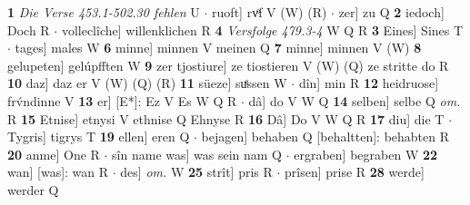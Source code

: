 \documentclass[8pt,a4paper,notitlepage]{article}
\begin{document}
\begin{table}[ht]
\begin{minipage}[t]{0.5\linewidth}
\textbf{1} \textit{Die Verse 453.1-502.30 fehlen} U   $\cdot$ ruoft] rvͦf V (W) (R)  $\cdot$ zer] zu Q \textbf{2} iedoch] Doch R  $\cdot$ volleclîche] willenklichen R \textbf{4} \textit{Versfolge 479.3-4} W Q R  \textbf{3} Eines] Sines T  $\cdot$ tages] males W \textbf{6} minne] minnen V meinen Q \textbf{7} minne] minnen V (W) \textbf{8} gelupeten] gelúpfften W \textbf{9} zer tjostiure] ze tiostieren V (W) (Q) ze stritte do R \textbf{10} daz] daz er V (W) (Q) (R) \textbf{11} süeze] suͤssen W  $\cdot$ dîn] min R \textbf{12} heidruose] frv́ndinne V \textbf{13} er] [E*]: Ez V Es W Q R  $\cdot$ dâ] do V W Q \textbf{14} selben] selbe Q \textit{om.} R \textbf{15} Etnise] etnysi V ethnise Q Ehnyse R \textbf{16} Dâ] Do V W Q R \textbf{17} diu] die T  $\cdot$ Tygris] tigrys T \textbf{19} ellen] eren Q  $\cdot$ bejagen] behaben Q [behaltten]: behabten R \textbf{20} anme] One R  $\cdot$ sîn name was] was sein nam Q  $\cdot$ ergraben] begraben W \textbf{22} wan] [was]: wan R  $\cdot$ des] \textit{om.} W \textbf{25} strît] pris R  $\cdot$ prîsen] prise R \textbf{28} werde] werder Q \newline
\end{minipage}
\end{table}
\end{document}

